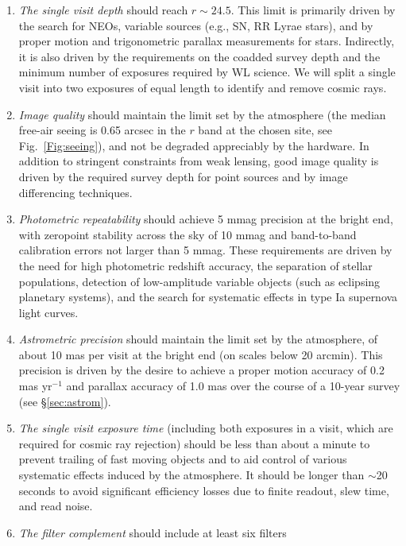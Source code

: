 \begin{enumerate}
\item  {\it The single visit depth} should reach $r\sim24.5$. This limit is
   primarily driven by the search for NEOs, variable sources (e.g., SN,
   RR Lyrae stars), and by proper motion and trigonometric parallax
   measurements for stars. Indirectly, it is also driven by the
   requirements on the coadded survey depth and the minimum number of
   exposures required by WL science.  We will split a single visit
   into two exposures of equal length to identify and remove cosmic
   rays.
\item  {\it Image quality} should maintain the limit set by the
     atmosphere (the median free-air seeing is 0.65 arcsec in the $r$ band
     at the chosen site, see Fig.~\ref{Fig:seeing}),
     and not be degraded appreciably by the hardware. In addition to stringent
     constraints from weak lensing, good image quality is driven by the
     required survey depth for point sources and by image differencing
     techniques.
\item  {\it Photometric repeatability} should achieve 5 mmag precision
     at the bright end, with zeropoint stability across the sky of 10 mmag
     and band-to-band calibration errors not larger than 5 mmag.
     These requirements are driven by the need for high photometric redshift accuracy,
     the separation of stellar populations, detection of low-amplitude variable
     objects (such as eclipsing planetary systems), and the search for
     systematic effects in type Ia supernova light curves.
\item  {\it Astrometric precision} should maintain the limit set by
     the atmosphere, of about 10 mas per visit at the bright end
     (on scales below 20 arcmin). This precision is driven by the desire to
     achieve a proper motion accuracy of 0.2 mas yr$^{-1}$ and parallax accuracy of
     1.0 mas over the course of a 10-year survey (see \S \ref{sec:astrom}).
\item  {\it The single visit exposure time} (including both exposures in a
    visit, which are required for cosmic ray rejection) should be less than about a minute
    to prevent trailing of fast moving objects and to aid control
    of various systematic effects induced by the atmosphere. It should
    be longer than $\sim$20 seconds to avoid significant efficiency losses due to
    finite readout, slew time, and read noise.
\item  {\it The filter complement} should include at least six filters

\end{enumerate}

